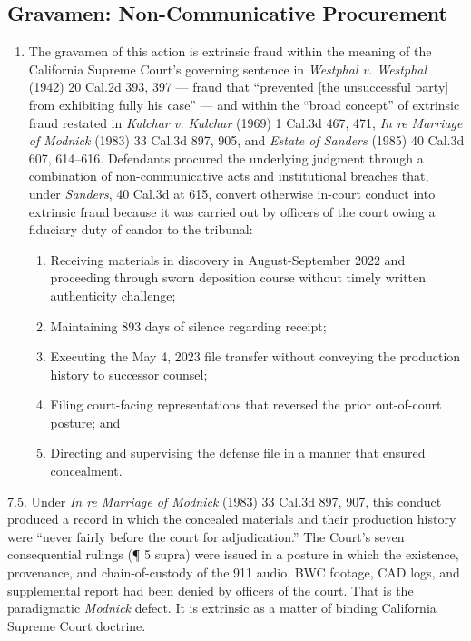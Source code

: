 \subsection{Gravamen: Non-Communicative Procurement}\label{gravamen-non-communicative-procurement}

\begin{enumerate}
\def\labelenumi{\arabic{enumi}.}
\setcounter{enumi}{6}
\item
  The gravamen of this action is extrinsic fraud within the meaning of the California Supreme Court's governing sentence in \emph{Westphal v. Westphal} (1942) 20 Cal.2d 393, 397 --- fraud that ``prevented {[}the unsuccessful party{]} from exhibiting fully his case'' --- and within the ``broad concept'' of extrinsic fraud restated in \emph{Kulchar v. Kulchar} (1969) 1 Cal.3d 467, 471, \emph{In re Marriage of Modnick} (1983) 33 Cal.3d 897, 905, and \emph{Estate of Sanders} (1985) 40 Cal.3d 607, 614--616. Defendants procured the underlying judgment through a combination of non-communicative acts and institutional breaches that, under \emph{Sanders}, 40 Cal.3d at 615, convert otherwise in-court conduct into extrinsic fraud because it was carried out by officers of the court owing a fiduciary duty of candor to the tribunal:

  \begin{enumerate}
  \def\labelenumii{(\alph{enumii})}
  \item
    Receiving materials in discovery in August-September 2022 and proceeding through sworn deposition course without timely written authenticity challenge;
  \item
    Maintaining 893 days of silence regarding receipt;
  \item
    Executing the May 4, 2023 file transfer without conveying the production history to successor counsel;
  \item
    Filing court-facing representations that reversed the prior out-of-court posture; and
  \item
    Directing and supervising the defense file in a manner that ensured concealment.
  \end{enumerate}
\end{enumerate}

7.5. Under \emph{In re Marriage of Modnick} (1983) 33 Cal.3d 897, 907, this conduct produced a record in which the concealed materials and their production history were ``never fairly before the court for adjudication.'' The Court's seven consequential rulings (¶ 5 supra) were issued in a posture in which the existence, provenance, and chain-of-custody of the 911 audio, BWC footage, CAD logs, and supplemental report had been denied by officers of the court. That is the paradigmatic \emph{Modnick} defect. It is extrinsic as a matter of binding California Supreme Court doctrine.

